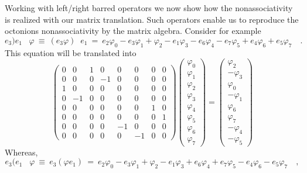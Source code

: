 \documentclass[a4paper,12pt]{book}
\begin{document}
Working with left/right barred operators we now show how the
nonassociativity is realized with our matrix translation. Such operators
enable us to reproduce the octonions nonassociativity by the matrix algebra.
Consider for example 
\begin{equation}
e_{3}\mathbf{)}e_{1}\;\;\;\varphi ~\equiv ~(e_{3}\varphi
)\;\;e_{1}~=~e_{2}\varphi _{0}-e_{3}\varphi _{1}+\varphi _{2}-e_{1}\varphi
_{3}-e_{6}\varphi _{4}-e_{7}\varphi _{5}+e_{4}\varphi _{6}+e_{5}\varphi
_{7}\quad .
\end{equation}
This equation will be translated into 
\begin{equation}
\left( 
\begin{array}{llllllll}
0 & 0 & 1 & 0 & 0 & 0 & 0 & 0 \\ 
0 & 0 & 0 & -1 & 0 & 0 & 0 & 0 \\ 
1 & 0 & 0 & 0 & 0 & 0 & 0 & 0 \\ 
0 & -1 & 0 & 0 & 0 & 0 & 0 & 0 \\ 
0 & 0 & 0 & 0 & 0 & 0 & 1 & 0 \\ 
0 & 0 & 0 & 0 & 0 & 0 & 0 & 1 \\ 
0 & 0 & 0 & 0 & -1 & 0 & 0 & 0 \\ 
0 & 0 & 0 & 0 & 0 & -1 & 0 & 0
\end{array}
\right) \left( 
\begin{array}{l}
\varphi _{0} \\ 
\varphi _{1} \\ 
\varphi _{2} \\ 
\varphi _{3} \\ 
\varphi _{4} \\ 
\varphi _{5} \\ 
\varphi _{6} \\ 
\varphi _{7}
\end{array}
\right) =\left( 
\begin{array}{l}
\varphi _{2} \\ 
-\varphi _{3} \\ 
\varphi _{0} \\ 
-\varphi _{1} \\ 
\varphi _{6} \\ 
\varphi _{7} \\ 
-\varphi _{4} \\ 
-\varphi _{5}
\end{array}
\right)
\end{equation}
Whereas, 
\begin{equation}
e_{3}\mathbf{(}e_{1}\;\;\;\varphi ~\equiv ~e_{3}(\varphi
e_{1})~=~e_{2}\varphi _{0}-e_{3}\varphi _{1}+\varphi _{2}-e_{1}\varphi
_{3}+e_{6}\varphi _{4}+e_{7}\varphi _{5}-e_{4}\varphi _{6}-e_{5}\varphi
_{7}\quad ,
\end{equation}
\end{document}
